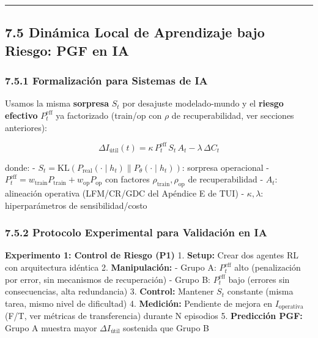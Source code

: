 \begin{center}\rule{0.5\linewidth}{0.5pt}\end{center}

\subsection{7.5 Dinámica Local de Aprendizaje bajo Riesgo: PGF en
IA}\label{dinuxe1mica-local-de-aprendizaje-bajo-riesgo-pgf-en-ia}

\subsubsection{7.5.1 Formalización para Sistemas de
IA}\label{formalizaciuxf3n-para-sistemas-de-ia}

Usamos la misma \textbf{sorpresa} \(S_t\) por desajuste modelado-mundo y
el \textbf{riesgo efectivo} \(P^{\text{eff}}_t\) ya factorizado
(train/op con \(\rho\) de recuperabilidad, ver secciones anteriores):

\[
\Delta I_{\text{útil}}(t) = \kappa \, P^{\text{eff}}_t \, S_t \, A_t - \lambda \, \Delta C_t
\]

donde: -
\(S_t = \text{KL}(P_{\text{real}}(\cdot \mid h_t) \parallel P_\theta(\cdot \mid h_t))\):
sorpresa operacional -
\(P^{\text{eff}}_t = w_{\text{train}} P_{\text{train}} + w_{\text{op}} P_{\text{op}}\)
con factores \(\rho_{\text{train}}, \rho_{\text{op}}\) de
recuperabilidad - \(A_t\): alineación operativa (LFM/CR/GDC del Apéndice
E de TUI) - \(\kappa, \lambda\): hiperparámetros de sensibilidad/costo

\subsubsection{7.5.2 Protocolo Experimental para Validación en
IA}\label{protocolo-experimental-para-validaciuxf3n-en-ia}

\textbf{Experimento 1: Control de Riesgo (P1)} 1. \textbf{Setup:} Crear
dos agentes RL con arquitectura idéntica 2. \textbf{Manipulación:} -
Grupo A: \(P^{\text{eff}}_t\) alto (penalización por error, sin
mecanismos de recuperación) - Grupo B: \(P^{\text{eff}}_t\) bajo
(errores sin consecuencias, alta redundancia) 3. \textbf{Control:}
Mantener \(S_t\) constante (misma tarea, mismo nivel de dificultad) 4.
\textbf{Medición:} Pendiente de mejora en \(I_{\text{operativa}}\) (F/T,
ver métricas de transferencia) durante N episodios 5. \textbf{Predicción
PGF:} Grupo A muestra mayor \(\Delta I_{\text{útil}}\) sostenida que
Grupo B

